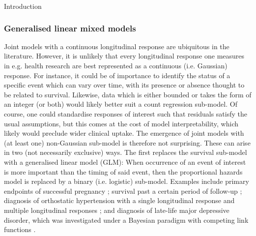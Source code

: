 \begin{chapter}{\label{cha:intro}Introduction}
  \subsubsection*{\label{sec:lit-glmm}Generalised linear mixed models}
  \addtocounter{subsubsection}{1}
  Joint models with a continuous longitudinal response are ubiquitous in the literature. However, it is unlikely that every longitudinal response one measures in e.g. health research are best represented as a continuous (i.e. Gaussian) response. For instance, it could be of importance to identify the status of a specific event which can vary over time, with its presence or absence thought to be related to survival. Likewise, data which is either bounded or takes the form of an integer (or both) would likely better suit a count regression sub-model. Of course, one could standardise responses of interest such that residuals satisfy the usual assumptions, but this comes at the cost of model interpretability, which likely would preclude wider clinical uptake.\newline
  The emergence of joint models with (at least one) non-Gaussian sub-model is therefore not surprising. These can arise in two (not necessarily exclusive) ways. The first replaces the survival sub-model with a generalised linear model (GLM): When occurrence of an event of interest is more important than the timing of said event, then the proportional hazards model is replaced by a binary (i.e. logistic) sub-model. Examples include primary endpoints of successful pregnancy \citep{Horrocks2009}; survival past a certain period of follow-up \citep{Bernhardt15}; diagnosis of orthostatic hypertension with a single longitudinal response \citep{Hwang2011} and multiple longitudinal responses \citep{Hwang2015}; and diagnosis of late-life major depressive disorder, which was investigated under a Bayesian paradigm with competing link functions \citep{li2015flexible}.\newline 

\end{chapter}

